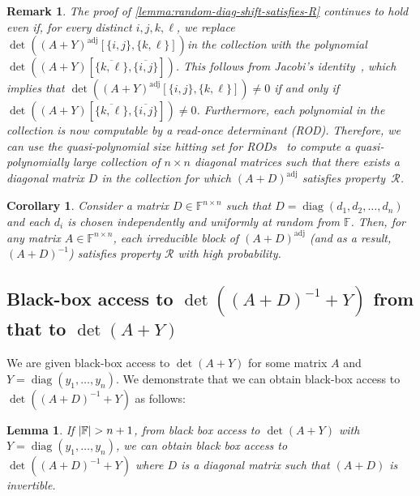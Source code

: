 \documentclass[11pt,letterpaper]{article}
\DeclarePairedDelimiter{\card}{|}{|}
\DeclareMathOperator*{\diag}{diag}
\newcommand{\comp}[1]{\overline{#1}}
\newcommand{\F}{\mathbb{F}}
\newtheorem{lemma}{Lemma}[section]
\newtheorem{corollary}{Corollary}[section]
\newtheorem{remark}{Remark}[section]
\DeclareMathOperator{\ad}{adj}
\newcommand{\adj}[1]{(#1)^{\ad}}
\newcommand{\prop}{\mathcal{R}}
\begin{document}
{{{\begin{remark}\label{lemma:random-diag-shift-satisfies-R-derandomization}
    The proof of \cref{lemma:random-diag-shift-satisfies-R} continues to hold even if, for every distinct $i,j,k,\ell$, we replace $\det\left(\adj{A+Y}[\{i,j\},\{k,\ell\}]\right)$in the collection with the polynomial $\det((A+Y)[\comp{\{k,\ell\}},\comp{\{i,j\} }])$. This follows from Jacobi's identity~\cite[Page~21]{Gantmacher59}, which implies that $\det\left(\adj{A+Y}[\{i,j\},\{k,\ell\}]\right)\neq 0$ if and only if $\det((A+Y)[\comp{\{k,\ell\}},\comp{\{i,j\} }]) \neq 0$.  Furthermore, each polynomial in the collection is now computable by a read-once determinant (ROD). Therefore, we can use the quasi-polynomial size hitting set for RODs~\cite{GT20} to compute a quasi-polynomially large collection of $n\times n$ diagonal matrices such that there exists a diagonal matrix $D$ in the collection for which $\adj{A+D}$ satisfies property~$\prop$.
\end{remark}

\begin{corollary}\label{lemma:random-diag-shift-satisfies-R-for-irred-comp}
    Consider a matrix $D\in \F^{n\times n}$ such that $D = \diag(d_1, d_2, \ldots, d_n)$ and each $d_i$ is chosen independently and uniformly at random from $\F$. Then, for any matrix $A\in \F^{n\times n}$, each irreducible block of $\adj{A+D}$ (and as a result, $(A+D)^{-1}$) satisfies property $\prop$ with high probability.
\end{corollary}

\subsection{Black-box access to \texorpdfstring{$\det((A + D)^{-1} + Y)$}{det((A+D)\^(-1) + Y)} from that to \texorpdfstring{$\det(A + Y)$}{det(A + Y)}}

We are given black-box access to $\det(A+Y)$ for some matrix $A$ and $Y = \diag(y_1,\dots,y_n)$. We demonstrate that we can obtain black-box access to $\det((A+D)^{-1} + Y)$ as follows:

\begin{lemma}\label{lem:bba_to_adj} If $\card{\F} > n+1$, from black box access to $\det(A+Y)$ with $Y = \diag(y_1,\dots,y_n)$, we can obtain black box access to $\det((A+D)^{-1} + Y)$ where $D$ is a diagonal matrix such that $(A+D)$ is invertible. \end{lemma}

}}}
\end{document}
